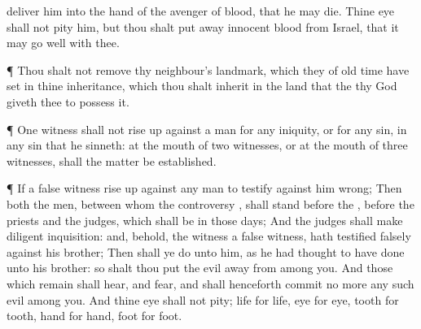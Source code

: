 {deliver him into the
hand of the
avenger of
blood, that he may
die.
Thine
eye shall not
pity him, but thou shalt put
away
{}
innocent
blood from
Israel, that it may go
well with thee.
\par }{\PP {}¶ Thou shalt not
remove thy
neighbour’s
landmark, which they of old
time have
set in thine
inheritance, which thou shalt
inherit in the
land that the
{} thy
God
giveth thee to
possess it.
\par }{\PP {}¶
One
witness shall not rise
up against a
man for any
iniquity, or for any
sin, in any
sin that he
sinneth: at the
mouth of
two
witnesses, or at the
mouth of
three
witnesses, shall the
matter be
established.
\par }{\PP {}¶ If a
false
witness rise
up against any
man to
testify against him
{}
wrong;
Then
both the
men, between whom the
controversy
{}, shall
stand
before the
{},
before the
priests and the
judges, which shall be in those
days;
And the
judges shall make
diligent
inquisition: and, behold,
{} the
witness
{} a
false
witness,
{} hath
testified
falsely against his
brother;
Then shall ye
do unto him, as he had
thought to have
done unto his
brother: so shalt thou
put the
evil
away from
among you.
And those which
remain shall
hear, and
fear, and shall
henceforth
commit no more
any such
evil
among you.
And thine
eye shall not
pity;
{}
life
{} for
life,
eye for
eye,
tooth for
tooth,
hand for
hand,
foot for
foot.

}
